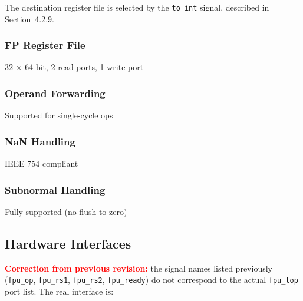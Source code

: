 The destination register file is selected by the \texttt{to\_int} signal,
described in Section~4.2.9.

\subsubsection{FP Register File}
32 × 64-bit, 2 read ports, 1 write port

\subsubsection{Operand Forwarding}
Supported for single-cycle ops

\subsubsection{NaN Handling}
IEEE 754 compliant

\subsubsection{Subnormal Handling}
Fully supported (no flush-to-zero)

\subsection{Hardware Interfaces}
\textcolor{red}{\textbf{Correction from previous revision:}} the signal
names listed previously (\texttt{fpu\_op}, \texttt{fpu\_rs1},
\texttt{fpu\_rs2}, \texttt{fpu\_ready}) do not correspond to the actual
\texttt{fpu\_top} port list. The real interface is:

